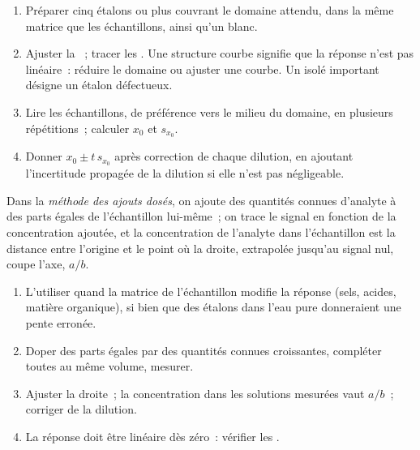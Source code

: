 \begin{method}[Étalonner]\label{met:b2:measurement-statistics:calibrate}
\begin{enumerate}
  \item Préparer cinq étalons ou plus couvrant le domaine attendu, dans la même matrice que les
        échantillons, ainsi qu'un blanc.
  \item Ajuster la ~; tracer les . Une structure courbe signifie que la
        réponse n'est pas linéaire~: réduire le domaine ou ajuster une courbe. Un  isolé important
        désigne un étalon défectueux.
  \item Lire les échantillons, de préférence vers le milieu du domaine, en plusieurs répétitions~;
        calculer $x_0$ et
        $s_{x_0}$.
  \item Donner $x_0 \pm t\,s_{x_0}$ après correction de chaque dilution, en ajoutant l'incertitude propagée
        de la dilution si elle n'est pas négligeable.
\end{enumerate}
\end{method}

\begin{definition}\label{def:b2:measurement-statistics:standard-addition}
Dans la \emph{méthode des ajouts dosés}, on
ajoute des quantités connues d'analyte à des parts égales de l'échantillon lui-même~; on trace le signal
en fonction de la concentration ajoutée, et la concentration de l'analyte dans l'échantillon est la
distance entre l'origine et le point où la droite, extrapolée jusqu'au signal nul, coupe l'axe, $a/b$.
\end{definition}

\begin{method}\label{met:b2:measurement-statistics:standard-addition}
\begin{enumerate}
  \item L'utiliser quand la matrice de l'échantillon modifie la réponse (sels, acides, matière organique),
        si bien que des étalons dans l'eau pure donneraient une pente erronée.
  \item Doper des parts égales par des quantités connues croissantes, compléter toutes au même volume,
        mesurer.
  \item Ajuster la droite~; la concentration dans les solutions mesurées vaut $a/b$~; corriger de la dilution.
  \item La réponse doit être linéaire dès zéro~: vérifier les .
\end{enumerate}
\end{method}

